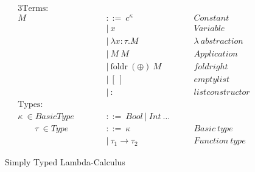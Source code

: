 
\begin{figure}[!htbp]
\begin{alignat}{3}
  \text{Terms:} \qquad\qquad\qquad      & \nonumber \label{eq:terms_simple_typed_lambda} \\
                               M~ & {::= } ~ {c^{\kappa}} & \qquad Constant\\
                                  & | ~ {x} & \qquad Variable \\
                                  & | ~ {\lambda x:\tau.M} & \qquad \lambda~abstraction \label{eqn:typed_lambda-abstraction}\\
                                  & | ~ {M~M} & \qquad Application\\
                                  & | ~ \text{foldr}~(\oplus{})~M & \qquad fold right\\
                                  & | ~ [~] & \qquad empty list\\
                                  & | ~ : & \qquad list constructor\\
  \text{Types:} \qquad\qquad\qquad &       & \nonumber \\
        {\kappa~ \in BasicType~~} &  {::= ~Bool~ | ~Int~ \dots}\\
                \qquad {\tau~ \in Type~~}        &  {::= } {~\kappa~ } &   \qquad Basic~type\\
                                                 &  |      {~\tau_1 \rightarrow \tau_2~} & \qquad Function~type
\end{alignat}
\caption{Simply Typed Lambda-Calculus}\label{eq:types_simple_typed_lambda}
\end{figure}



